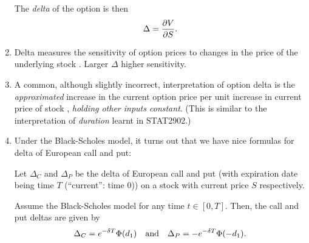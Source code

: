 \begin{enumerate}
The \emph{delta} of the option is then
\[
\Delta=\pdv{V}{S}.
\]
\item Delta measures the sensitivity of option prices to changes in the price
of the underlying stock . Larger \(\Delta\)
 higher sensitivity.

\item A common, although slightly incorrect, interpretation of option delta is
the \emph{approximated} increase in the current option price per unit increase
in current price of stock , \emph{holding other inputs
constant}. (This is similar to the interpretation of \emph{duration} learnt
in STAT2902.)

\item Under the Black-Scholes model, it turns out that we have nice formulas
for delta of European call and put:
\begin{proposition}
\label{prp:bs-call-put-delta}
Let \(\Delta_C\) and \(\Delta_P\) be the delta of European call and put (with
expiration date being time \(T\) (``current'': time 0)) on a stock
 with current price \(S\) respectively.

Assume the Black-Scholes model for any time \(t\in[0,T]\). Then, the call and
put deltas are given by
\[
\Delta_C=e^{-\delta T}\Phi(d_1)\qqtext{and}\Delta_P=-e^{-\delta T}\Phi(-d_1).
\]
\end{proposition}
\end{enumerate}

